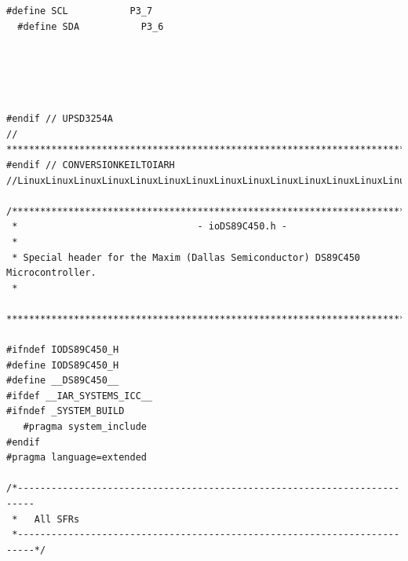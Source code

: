 \documentclass[10pt,a4paper,final]{article}
\begin{document}
\begin{lstlisting}[label={list:first},caption=Code source]
  #define SCL           P3_7
  #define SDA           P3_6





#endif // UPSD3254A
// *****************************************************************************
#endif // CONVERSIONKEILTOIARH
//LinuxLinuxLinuxLinuxLinuxLinuxLinuxLinuxLinuxLinuxLinuxLinuxLinuxLinuxLinuxTUX

/***************************************************************************
 *                                - ioDS89C450.h -
 *
 * Special header for the Maxim (Dallas Semiconductor) DS89C450 Microcontroller.
 *
 ***************************************************************************/

#ifndef IODS89C450_H
#define IODS89C450_H
#define __DS89C450__
#ifdef __IAR_SYSTEMS_ICC__
#ifndef _SYSTEM_BUILD
   #pragma system_include
#endif
#pragma language=extended

/*-------------------------------------------------------------------------
 *   All SFRs
 *-------------------------------------------------------------------------*/


\end{lstlisting}
\end{document}

